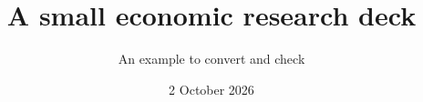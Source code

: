 \documentclass[aspectratio=169]{beamer}
\title{A small economic research deck}
\subtitle{An example to convert and check}
\author{}
\date{2 October 2026}
\begin{document}
\begin{frame}\titlepage\end{frame}

\end{document}
